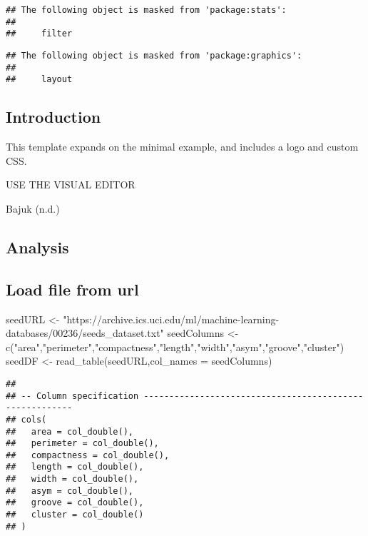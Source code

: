 \documentclass[
]{article}
\newenvironment{Shaded}{\begin{snugshade}}{\end{snugshade}}
\newcommand{\AttributeTok}[1]{\textcolor[rgb]{0.77,0.63,0.00}{#1}}
\newcommand{\FunctionTok}[1]{\textcolor[rgb]{0.00,0.00,0.00}{#1}}
\newcommand{\NormalTok}[1]{#1}
\newcommand{\OtherTok}[1]{\textcolor[rgb]{0.56,0.35,0.01}{#1}}
\newcommand{\StringTok}[1]{\textcolor[rgb]{0.31,0.60,0.02}{#1}}
\begin{document}
\begin{verbatim}
## The following object is masked from 'package:stats':
## 
##     filter
\end{verbatim}

\begin{verbatim}
## The following object is masked from 'package:graphics':
## 
##     layout
\end{verbatim}

\hypertarget{introduction}{%
\subsection{Introduction}\label{introduction}}

This template expands on the minimal example, and includes a logo and
custom CSS.

USE THE VISUAL EDITOR

Bajuk (n.d.)

\hypertarget{analysis}{%
\subsection{Analysis}\label{analysis}}

\hypertarget{load-file-from-url}{%
\subsection{Load file from url}\label{load-file-from-url}}

\begin{Shaded}
\begin{Highlighting}[]
\NormalTok{seedURL }\OtherTok{\textless{}{-}} \StringTok{"https://archive.ics.uci.edu/ml/machine{-}learning{-}databases/00236/seeds\_dataset.txt"}
\NormalTok{seedColumns }\OtherTok{\textless{}{-}} \FunctionTok{c}\NormalTok{(}\StringTok{"area"}\NormalTok{,}\StringTok{"perimeter"}\NormalTok{,}\StringTok{"compactness"}\NormalTok{,}\StringTok{"length"}\NormalTok{,}\StringTok{"width"}\NormalTok{,}\StringTok{"asym"}\NormalTok{,}\StringTok{"groove"}\NormalTok{,}\StringTok{"cluster"}\NormalTok{)}
\NormalTok{seedDF }\OtherTok{\textless{}{-}}  \FunctionTok{read\_table}\NormalTok{(seedURL,}\AttributeTok{col\_names =}\NormalTok{ seedColumns)}
\end{Highlighting}
\end{Shaded}

\begin{verbatim}
## 
## -- Column specification --------------------------------------------------------
## cols(
##   area = col_double(),
##   perimeter = col_double(),
##   compactness = col_double(),
##   length = col_double(),
##   width = col_double(),
##   asym = col_double(),
##   groove = col_double(),
##   cluster = col_double()
## )
\end{verbatim}
\end{document}
